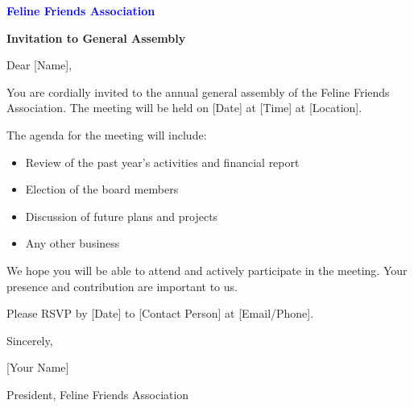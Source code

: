 \documentclass{letter}
\begin{document}
\begin{center}

\vspace{1cm}

{\Large\textbf{\textcolor{blue}{Feline Friends Association}}}

\vspace{0.5cm}

{\large\textbf{Invitation to General Assembly}}

\vspace{1cm}

Dear [Name],

You are cordially invited to the annual general assembly of the Feline Friends Association. The meeting will be held on [Date] at [Time] at [Location].

The agenda for the meeting will include:

\begin{itemize}
    \item Review of the past year's activities and financial report
    \item Election of the board members
    \item Discussion of future plans and projects
    \item Any other business
\end{itemize}

We hope you will be able to attend and actively participate in the meeting. Your presence and contribution are important to us.

Please RSVP by [Date] to [Contact Person] at [Email/Phone].

Sincerely,

[Your Name]

President, Feline Friends Association

\end{center}
\end{document}
